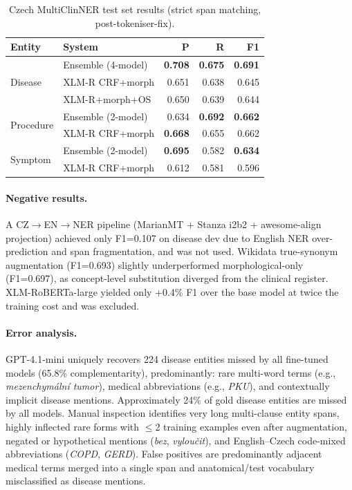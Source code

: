 \documentclass[11pt]{article}
\begin{document}
\begin{table}[h]
\centering
\small
\begin{tabular}{llrrr}
\toprule
\textbf{Entity} & \textbf{System} & \textbf{P} & \textbf{R} & \textbf{F1} \\
\midrule
\multirow{3}{*}{Disease}
  & Ensemble (4-model)  & \textbf{0.708} & \textbf{0.675} & \textbf{0.691} \\
  & XLM-R CRF+morph     & 0.651          & 0.638          & 0.645 \\
  & XLM-R+morph+OS      & 0.650          & 0.639          & 0.644 \\
\midrule
\multirow{2}{*}{Procedure}
  & Ensemble (2-model)  & 0.634          & \textbf{0.692} & \textbf{0.662} \\
  & XLM-R CRF+morph     & \textbf{0.668} & 0.655          & 0.662 \\
\midrule
\multirow{2}{*}{Symptom}
  & Ensemble (2-model)  & \textbf{0.695} & 0.582 & \textbf{0.634} \\
  & XLM-R CRF+morph     & 0.612          & 0.581 & 0.596 \\
\bottomrule
\end{tabular}
\caption{Czech MultiClinNER test set results (strict span matching, post-tokeniser-fix).}
\label{tab:cz-test}
\end{table}

\paragraph{Negative results.}
A CZ$\to$EN$\to$NER pipeline (MarianMT + Stanza i2b2 + awesome-align projection)
achieved only F1=0.107 on disease dev due to English NER over-prediction and span
fragmentation, and was not used.
Wikidata true-synonym augmentation (F1=0.693) slightly underperformed morphological-only
(F1=0.697), as concept-level substitution diverged from the clinical register.
XLM-RoBERTa-large yielded only +0.4\% F1 over the base model at twice the training cost
and was excluded.

\paragraph{Error analysis.}
GPT-4.1-mini uniquely recovers 224 disease entities missed by all fine-tuned models
(65.8\% complementarity), predominantly: rare multi-word terms (e.g.,
\textit{mezenchymální tumor}), medical abbreviations (e.g., \textit{PKU}), and
contextually implicit disease mentions.
Approximately 24\% of gold disease entities are missed by all models. Manual
inspection identifies very long multi-clause entity spans, highly inflected rare
forms with $\leq$2 training examples even after augmentation, negated or hypothetical
mentions (\textit{bez}, \textit{vyloučit}), and English--Czech code-mixed abbreviations
(\textit{COPD}, \textit{GERD}).
False positives are predominantly adjacent medical terms merged into a single span
and anatomical/test vocabulary misclassified as disease mentions.
\end{document}
